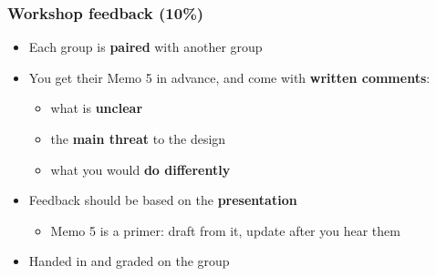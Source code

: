 \begin{frame}
\frametitle{Workshop feedback (10\%)}
\centering

\begin{itemize}
  \item Each group is \textbf{paired} with another group
  \vspace{4pt}
  \item You get their Memo 5 in advance, and come with \textbf{written comments}:
  \begin{itemize}
    \item what is \textbf{unclear}
    \item the \textbf{main threat} to the design
    \item what you would \textbf{do differently}
  \end{itemize}
  \vspace{8pt}
  \item<2-> Feedback should be based on the \textbf{presentation}
  \begin{itemize}
    \item Memo 5 is a primer: draft from it, update after you hear them
  \end{itemize}
  \vspace{4pt}
  \item<2-> Handed in and graded on the group
\end{itemize}

\end{frame}

